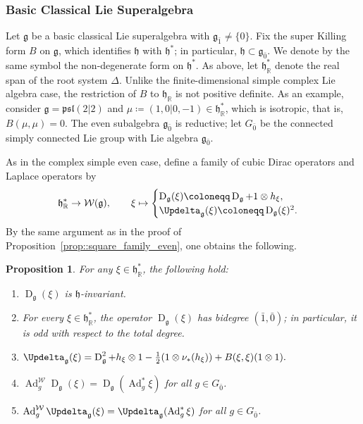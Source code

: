 \documentclass[11pt]{amsart}
\newcommand{\Dirac}{\operatorname{D}}
\def\Laplace{{\Updelta_{\gg}(\xi)}}
\def\RR{{\mathbb R}}
\def\hh{{\mathfrak h}}
\def\even{{\mathfrak{g}_{\bar{0}}}}
\def\odd{{\mathfrak{g}_{\bar{1}}}}
\def\gg{{\mathfrak{g}}}
\newcommand{\Ad}{\operatorname{Ad}}
\theoremstyle{plain}
\newtheorem{proposition}[theorem]{Proposition}
\theoremstyle{remark}
\theoremstyle{definition}
\numberwithin{equation}{section}
\theoremstyle{remark}
\begin{document}
\subsubsection{Basic Classical Lie Superalgebra} Let $\gg$ be a basic classical Lie superalgebra with $\odd\neq\{0\}$. Fix the super Killing form $B$ on $\gg$, which identifies $\hh$ with $\hh^{\ast}$; in particular, $\hh\subset\even$. We denote by the same symbol the non-degenerate form on $\hh^{\ast}$. As above, let $\hh^{\ast}_{\RR}$ denote the real span of the root system $\Delta$. Unlike the finite-dimensional simple complex Lie algebra case, the restriction of $B$ to $\hh_{\RR}$ is not positive definite. As an example, consider $\gg=\mathfrak{psl}(2\vert 2)$ and $\mu\coloneqq (1,0\vert 0,-1) \in \hh^{\ast}_{\RR}$, which is isotropic, that is, $B(\mu,\mu)=0$. The even subalgebra $\even$ is reductive; let $G_{\bar{0}}$ be the connected simply connected Lie group with Lie algebra $\even$.

As in the complex simple even case, define a family of cubic Dirac operators and Laplace operators by
\begin{equation}
\hh_{\RR}^{\ast}\to\mathcal{W}(\gg),\qquad
\xi\mapsto
\begin{cases}
\Dirac_{\gg}(\xi)\coloneqq \Dirac_{\gg}+1\otimes h_{\xi},\\
\Laplace\coloneqq \Dirac_{\gg}(\xi)^{2}.
\end{cases}
\end{equation}
By the same argument as in the proof of Proposition~\ref{prop::square_family_even}, one obtains the following.

\begin{proposition}
For any $\xi\in\hh_{\RR}^{\ast}$, the following hold:
\begin{enumerate}
\item[a)] $\Dirac_{\gg}(\xi)$ is $\hh$-invariant.
\item[b)] For every $\xi\in\hh_{\RR}^{\ast}$, the operator $\Dirac_{\gg}(\xi)$ has bidegree $(\bar{1},\bar{0})$; in particular, it is odd with respect to the total degree.
\item[c)] $\Laplace=\Dirac_{\gg}^{2}+h_{\xi}\otimes1-\tfrac{1}{2}(1\otimes\nu_{\ast}(h_{\xi}))+B(\xi,\xi)(1\otimes1).$
\item[d)] $\Ad^{\mathcal{W}}_{g}\Dirac_{\gg}(\xi)=\Dirac_{\gg}(\Ad_{g}^{\ast}\xi)$ for all $g\in G_{\bar{0}}$.
\item[e)] $\Ad_{g}^{\mathcal{W}} \Laplace=\Updelta_{\gg}(\Ad_{g}^{\ast}\xi)$ for all $g \in G_{\bar{0}}$.
\end{enumerate}
\end{proposition}
\end{document}
